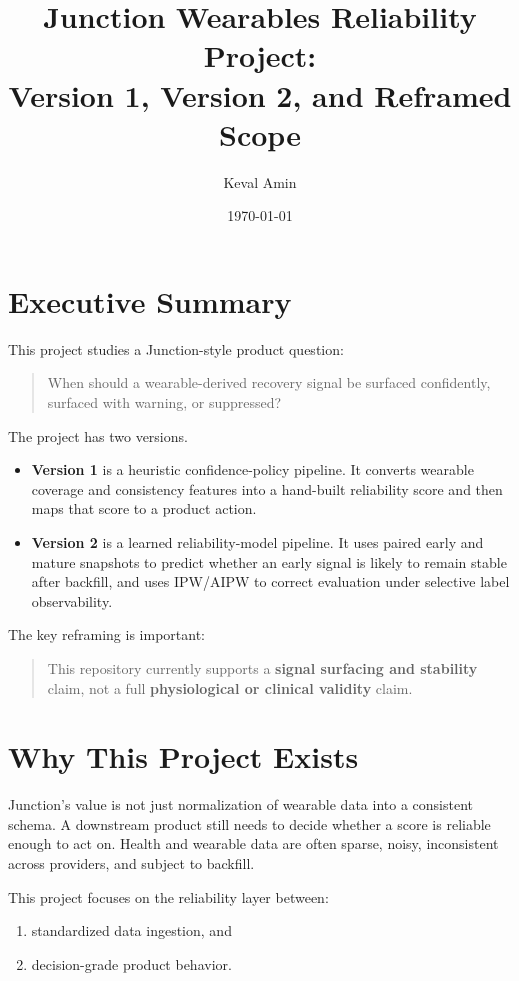 \documentclass[11pt]{article}
\title{Junction Wearables Reliability Project:\\Version 1, Version 2, and Reframed Scope}
\author{Keval Amin}
\date{\today}
\begin{document}
\maketitle

\section{Executive Summary}

This project studies a Junction-style product question:
\begin{quote}
When should a wearable-derived recovery signal be surfaced confidently, surfaced with warning, or suppressed?
\end{quote}

The project has two versions.

\begin{itemize}[leftmargin=1.5em]
    \item \textbf{Version 1} is a heuristic confidence-policy pipeline. It converts wearable coverage and consistency features into a hand-built reliability score and then maps that score to a product action.
    \item \textbf{Version 2} is a learned reliability-model pipeline. It uses paired early and mature snapshots to predict whether an early signal is likely to remain stable after backfill, and uses IPW/AIPW to correct evaluation under selective label observability.
\end{itemize}

The key reframing is important:
\begin{quote}
This repository currently supports a \textbf{signal surfacing and stability} claim, not a full \textbf{physiological or clinical validity} claim.
\end{quote}

\section{Why This Project Exists}

Junction's value is not just normalization of wearable data into a consistent schema. A downstream product still needs to decide whether a score is reliable enough to act on. Health and wearable data are often sparse, noisy, inconsistent across providers, and subject to backfill.

This project focuses on the reliability layer between:
\begin{enumerate}[leftmargin=1.5em]
    \item standardized data ingestion, and
    \item decision-grade product behavior.
\end{enumerate}
\end{document}
